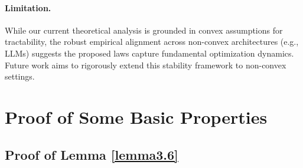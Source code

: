 



\paragraph{Limitation.} 
While our current theoretical analysis is grounded in convex assumptions for tractability, the robust empirical alignment across non-convex architectures (e.g., LLMs) suggests the proposed laws capture fundamental optimization dynamics. Future work aims to rigorously extend this stability framework to non-convex settings.

\section{Proof of Some Basic Properties}
\label{sec:app-a}



\subsection{Proof of Lemma \ref{lemma3.6}}\label{pro-lemma}  

